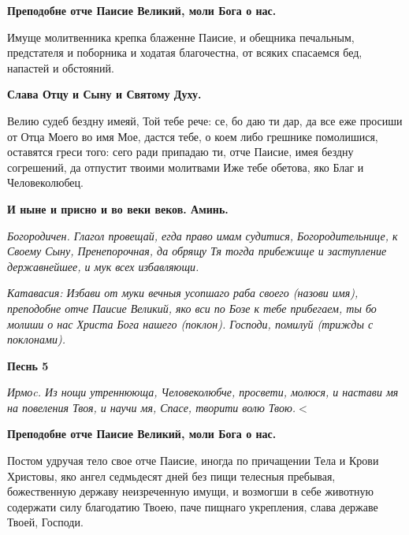 \bfseries Преподобне отче Паисие Великий, моли Бога о нас.\normalfont{}




Имуще молитвенника крепка блаженне Паисие, и обещника печальным, предстателя и поборника и ходатая благочестна, от всяких спасаемся бед, напастей и обстояний. 




\bfseries Слава Отцу и Сыну и Святому Духу.\normalfont{} 




Велию судеб бездну имеяй, Той тебе рече: се, бо даю ти дар, да все еже просиши от Отца Моего во имя Мое, дастся тебе, о коем либо грешнике
помолишися, оставятся греси того: сего ради припадаю ти, отче Паисие, имея бездну согрешений, да отпустит твоими молитвами Иже тебе обетова, яко Благ и Человеколюбец. 




\bfseries И ныне и присно и во веки веков. Аминь.\normalfont{} 




\itshape Богородичен.\normalfont{} Глагол провещай, егда право имам судитися, Богородительнице, к Своему Сыну, Пренепорочная, да обрящу Тя тогда прибежище и заступление державнейшее, и мук всех избавляющи. 




\itshape Катавасия:\normalfont{} Избави от муки вечныя усопшаго раба своего (\itshape назови имя\normalfont{}), преподобне отче Паисие Великий, яко вси по Бозе к тебе прибегаем, ты бо молиши о нас Христа Бога нашего (\itshape поклон\normalfont{}). Господи, помилуй (\itshape трижды с поклонами\normalfont{}). 




\bfseries Песнь 5\normalfont{}




\itshape Ирмоc.\normalfont{} Из нощи утреннююща, Человеколюбче, просвети, молюся, и настави мя на повеления Твоя, и научи мя, Спасе, творити волю Твою.$<$ 




\bfseries Преподобне отче Паисие Великий, моли Бога о нас. \normalfont{}




Постом удручая тело свое отче Паисие, иногда по причащении Тела и Крови Христовы, яко ангел седмьдесят дней без пищи телесныя пребывая, божественную державу неизреченную имущи, и возмогши в себе животную содержати силу благодатию Твоею, паче пищнаго укрепления, слава державе Твоей, Господи. 




